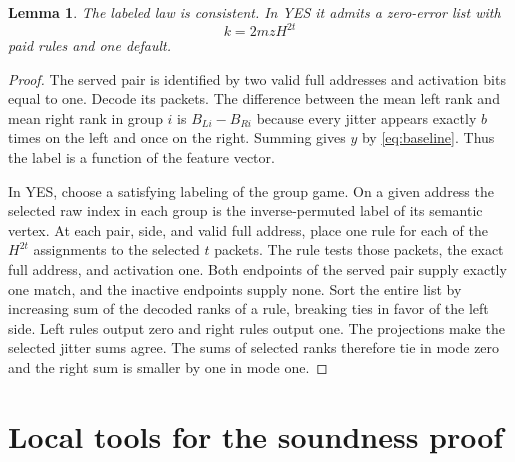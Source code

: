 \documentclass[11pt]{article}
\newtheorem{lemma}[theorem]{Lemma}
\begin{document}
\begin{lemma}\label{lem:yes}
The labeled law is consistent. In YES it admits a zero-error list with
\[
  k=2mzH^{2t}
\]
paid rules and one default.
\end{lemma}
\begin{proof}
The served pair is identified by two valid full addresses and
activation bits equal to one. Decode its packets. The difference
between the mean left rank and mean right rank in group $i$ is
$B_{Li}-B_{Ri}$ because every jitter appears exactly $b$ times
on the left and once on the right. Summing gives $y$ by
\eqref{eq:baseline}. Thus the label is a function of the feature vector.

In YES, choose a satisfying labeling of the group game. On a given
address the selected raw index in each group is the inverse-permuted
label of its semantic vertex. At each pair, side, and valid full
address, place one rule for each of the $H^{2t}$ assignments to the
selected $t$ packets. The rule tests those packets, the exact full
address, and activation one. Both endpoints of the served pair
supply exactly one match, and the inactive endpoints supply none.
Sort the entire list by increasing sum of the decoded ranks of a
rule, breaking ties in favor of the left side. Left rules output zero
and right rules output one. The projections make the selected
jitter sums agree. The sums of selected ranks therefore tie in
mode zero and the right sum is smaller by one in mode one.
\end{proof}

\section{Local tools for the soundness proof}\label{sec:tools}
\end{document}
